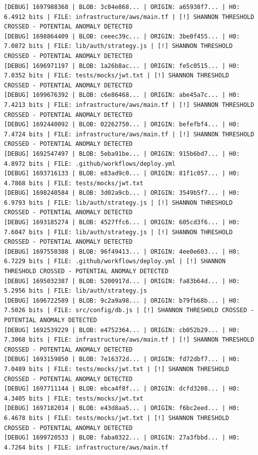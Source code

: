 \documentclass[12pt, a4paper, oneside]{report}
\begin{document}
\begin{lstlisting}[basicstyle=\tiny\ttfamily]
[DEBUG] 1697988368 | BLOB: 3c04e868... | ORIGIN: a65938f7... | H0: 6.4912 bits | FILE: infrastructure/aws/main.tf | [!] SHANNON THRESHOLD CROSSED - POTENTIAL ANOMALY DETECTED
[DEBUG] 1698864409 | BLOB: ceeec39c... | ORIGIN: 3be0f455... | H0: 7.0872 bits | FILE: lib/auth/strategy.js | [!] SHANNON THRESHOLD CROSSED - POTENTIAL ANOMALY DETECTED
[DEBUG] 1696971197 | BLOB: 1a26b8ac... | ORIGIN: fe5c0515... | H0: 7.0352 bits | FILE: tests/mocks/jwt.txt | [!] SHANNON THRESHOLD CROSSED - POTENTIAL ANOMALY DETECTED
[DEBUG] 1699676392 | BLOB: c6e86468... | ORIGIN: abe45a7c... | H0: 7.4213 bits | FILE: infrastructure/aws/main.tf | [!] SHANNON THRESHOLD CROSSED - POTENTIAL ANOMALY DETECTED
[DEBUG] 1692440092 | BLOB: 02262750... | ORIGIN: befefbf4... | H0: 7.4724 bits | FILE: infrastructure/aws/main.tf | [!] SHANNON THRESHOLD CROSSED - POTENTIAL ANOMALY DETECTED
[DEBUG] 1692547497 | BLOB: 5eba91be... | ORIGIN: 915b6bd7... | H0: 4.8972 bits | FILE: .github/workflows/deploy.yml
[DEBUG] 1693716133 | BLOB: e83ad9c0... | ORIGIN: 81f1c057... | H0: 4.7868 bits | FILE: tests/mocks/jwt.txt
[DEBUG] 1698240584 | BLOB: 3d02a9cb... | ORIGIN: 3549b5f7... | H0: 6.9793 bits | FILE: lib/auth/strategy.js | [!] SHANNON THRESHOLD CROSSED - POTENTIAL ANOMALY DETECTED
[DEBUG] 1693185274 | BLOB: 4527ffc6... | ORIGIN: 605cd3f6... | H0: 7.6047 bits | FILE: lib/auth/strategy.js | [!] SHANNON THRESHOLD CROSSED - POTENTIAL ANOMALY DETECTED
[DEBUG] 1697550388 | BLOB: 96f49413... | ORIGIN: 4ee0e603... | H0: 6.7229 bits | FILE: .github/workflows/deploy.yml | [!] SHANNON THRESHOLD CROSSED - POTENTIAL ANOMALY DETECTED
[DEBUG] 1695032387 | BLOB: 5200917d... | ORIGIN: fa83b64d... | H0: 5.2956 bits | FILE: lib/auth/strategy.js
[DEBUG] 1696722589 | BLOB: 9c2a9a98... | ORIGIN: b79fb68b... | H0: 7.5026 bits | FILE: src/config/db.js | [!] SHANNON THRESHOLD CROSSED - POTENTIAL ANOMALY DETECTED
[DEBUG] 1692539229 | BLOB: e4752364... | ORIGIN: cb052b29... | H0: 7.3068 bits | FILE: infrastructure/aws/main.tf | [!] SHANNON THRESHOLD CROSSED - POTENTIAL ANOMALY DETECTED
[DEBUG] 1693159850 | BLOB: 7e16372d... | ORIGIN: fd72dbf7... | H0: 7.0489 bits | FILE: tests/mocks/jwt.txt | [!] SHANNON THRESHOLD CROSSED - POTENTIAL ANOMALY DETECTED
[DEBUG] 1697711144 | BLOB: ebca4f8f... | ORIGIN: dcfd3208... | H0: 4.3405 bits | FILE: tests/mocks/jwt.txt
[DEBUG] 1697182014 | BLOB: e43d8aa5... | ORIGIN: f6bc2eed... | H0: 6.4678 bits | FILE: tests/mocks/jwt.txt | [!] SHANNON THRESHOLD CROSSED - POTENTIAL ANOMALY DETECTED
[DEBUG] 1699720533 | BLOB: faba0322... | ORIGIN: 27a3fbbd... | H0: 4.7264 bits | FILE: infrastructure/aws/main.tf

\end{lstlisting}
\end{document}
